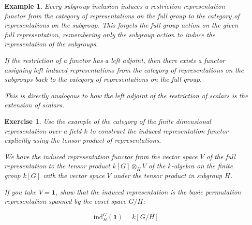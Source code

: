 \documentclass{tufte-book}
\newtheorem{example}[theorem]{Example}
\newtheorem{exercise}[theorem]{Exercise}
\begin{document}
\begin{example}
	Every subgroup inclusion induces a restriction representation functor from the category of representations on the full group to the category of representations on the subgroup. This forgets the full group action on the given full representation, remembering only the subgroup action to induce the representation of the subgroups.

	If the restriction of a functor has a left adjoint, then there exists a functor assigning left induced representations from the category of representations on the subgroups back to the category of representations on the full group. 
	
	This is directly analogous to how the left adjoint of the restriction of scalars is the extension of scalars.
\end{example}

\begin{exercise}
	Use the example of the category of the finite dimensional representation over a field $k$ to construct the induced representation functor explicitly using the tensor product of representations.

	We have the induced representation functor from the vector space $V$ of the full representation to the tensor product $k[G] \otimes_H V$ of the $k$-algebra on the finite group $k[G]$ with the vector space $V$ under the tensor product in subgroup $H$.
	
	If you take $V = \mathbf{1}$, show that the induced representation is the basic permutation representation spanned by the coset space $G/H$:

	\begin{equation}
		\mathrm{ind}_H^{G} (\mathbf{1})
		= k[G / H]
	\end{equation}

\end{exercise}
\end{document}
